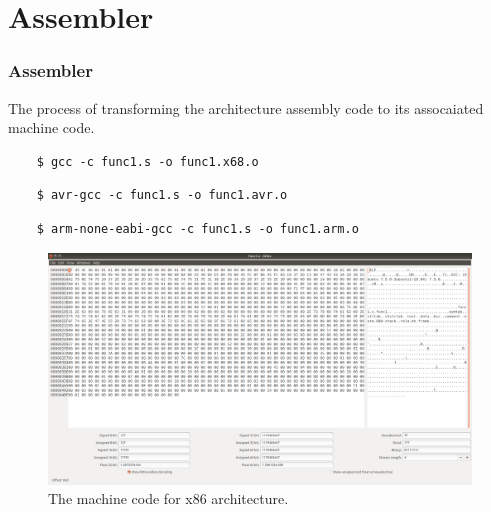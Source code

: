 \documentclass[]{beamer}
\begin{document}
\section{Assembler}
\begin{frame}[fragile]
  \frametitle{Assembler}
  The process of transforming the architecture assembly code to its assocaiated machine code.

  \begin{lstlisting}
    $ gcc -c func1.s -o func1.x68.o
  \end{lstlisting}

  \begin{lstlisting}
    $ avr-gcc -c func1.s -o func1.avr.o
  \end{lstlisting}

 
  \begin{lstlisting}
    $ arm-none-eabi-gcc -c func1.s -o func1.arm.o
  \end{lstlisting}
  
\end{frame}

\begin{frame}
  

  \begin{figure}[!htb]
    \centering
    \includegraphics[width=\linewidth]{figures/x86.png}
    \caption{The machine code for x86 architecture.}
    \label{fig:question}
  \end{figure}

\end{frame}
\end{document}
